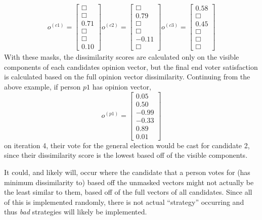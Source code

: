 \begin{align*}
o^{(c1)} = \begin{bmatrix}\Box \\ \Box \\ 0.71 \\ \Box \\ \Box \\ 0.10  \end{bmatrix}
o^{(c2)} = \begin{bmatrix}\Box \\ 0.79 \\ \Box \\ \Box \\ -0.11\\ \Box  \end{bmatrix}
o^{(c3)} = \begin{bmatrix}0.58 \\ \Box \\ 0.45 \\ \Box \\ \Box \\ \Box  \end{bmatrix}
\end{align*}
With these masks, the dissimilarity scores are calculated only on the visible components of each candidates opinion vector, but the final end voter satisfaction is calculated based on the full opinion vector dissimilarity.
Continuing from the above example, if person $p1$ has opinion vector, $$o^{(p1)}=\begin{bmatrix}0.05\\0.50\\-0.99\\-0.33\\0.89\\0.01\end{bmatrix}$$  on iteration 4, their vote for the general election would be cast for candidate 2, since their dissimilarity score is the lowest based off of the visible components.

It could, and likely will, occur where the candidate that a person votes for (has minimum dissimilarity to) based off the unmasked vectors might not actually be the least similar to them, based off of the full vectors of all candidates.
Since all of this is implemented randomly, there is not actual ``strategy'' occurring and thus {\it bad} strategies will likely be implemented.
